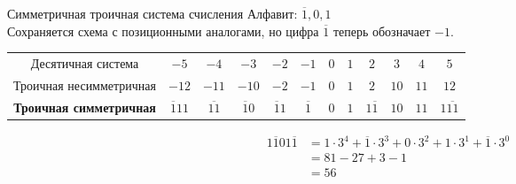 \documentclass[hyperref=unicode, aspectratio=169]{beamer}
\begin{document}
\begin{frame}{Симметричная троичная система счисления}
    Алфавит: $\overline{1}, 0, 1$ \\
    Сохраняется схема с позиционными аналогами, но цифра $\overline{1}$ теперь обозначает $-1$.
    \begin{table}
        \begin{tabular}{| c | c | c | c | c | c | c | c | c | c | c | c |}
            \hline
            Десятичная система             & $-5$             & $-4$            & $-3$            & $-2$            & $-1$           & $0$ & $1$ & $2$             & $3$  & $4$  & $5$              \\
            Троичная несимметричная        & $-12$            & $-11$           & $-10$           & $-2$            & $-1$           & $0$ & $1$ & $2$             & $10$ & $11$ & $12$             \\
            \textbf{Троичная симметричная} & $\overline{1}11$ & $\overline{11}$ & $\overline{1}0$ & $\overline{1}1$ & $\overline{1}$ & $0$ & $1$ & $1\overline{1}$ & $10$ & $11$ & $1\overline{11}$ \\
            \hline
        \end{tabular}
    \end{table}
    \begin{example}
        \begin{align*}
            1\overline{1}01\overline{1} & = 1 \cdot 3^4 + \overline{1} \cdot 3^3 + 0 \cdot 3^2 + 1 \cdot 3^1 + \overline{1} \cdot 3^0 \\
                                        & = 81 - 27 + 3 - 1                                                                           \\
                                        & = 56
        \end{align*}
    \end{example}
\end{frame}
\end{document}
